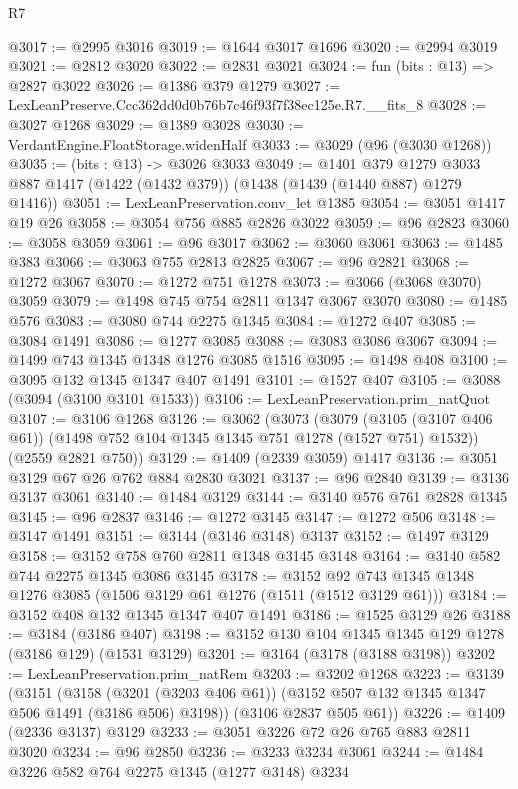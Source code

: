 \begin{lexlean}{R7}
\begin{coremodule}
@3017 := @2995 @3016
@3019 := @1644 @3017 @1696
@3020 := @2994 @3019
@3021 := @2812 @3020
@3022 := @2831 @3021
@3024 := fun (bits : @13) => @2827 @3022
@3026 := @1386 @379 @1279
@3027 := LexLeanPreserve.Ccc362dd0d0b76b7c46f93f7f38ec125e.R7.__fits_8
@3028 := @3027 @1268
@3029 := @1389 @3028
@3030 := VerdantEngine.FloatStorage.widenHalf
@3033 := @3029 (@96 (@3030 @1268))
@3035 := (bits : @13) -> @3026 @3033
@3049 := @1401
    @379
    @1279
    @3033
    @887
    @1417
    (@1422 (@1432 @379))
    (@1438 (@1439 (@1440 @887) @1279 @1416))
@3051 := LexLeanPreservation.conv_let @1385
@3054 := @3051 @1417 @19 @26
@3058 := @3054 @756 @885 @2826 @3022
@3059 := @96 @2823
@3060 := @3058 @3059
@3061 := @96 @3017
@3062 := @3060 @3061
@3063 := @1485 @383
@3066 := @3063 @755 @2813 @2825
@3067 := @96 @2821
@3068 := @1272 @3067
@3070 := @1272 @751 @1278
@3073 := @3066 (@3068 @3070) @3059
@3079 := @1498 @745 @754 @2811 @1347 @3067 @3070
@3080 := @1485 @576
@3083 := @3080 @744 @2275 @1345
@3084 := @1272 @407
@3085 := @3084 @1491
@3086 := @1277 @3085
@3088 := @3083 @3086 @3067
@3094 := @1499 @743 @1345 @1348 @1276 @3085 @1516
@3095 := @1498 @408
@3100 := @3095 @132 @1345 @1347 @407 @1491
@3101 := @1527 @407
@3105 := @3088 (@3094 (@3100 @3101 @1533))
@3106 := LexLeanPreservation.prim_natQuot
@3107 := @3106 @1268
@3126 := @3062
    (@3073
      (@3079 (@3105 (@3107 @406 @61)) (@1498 @752 @104 @1345 @1345 @751 @1278 (@1527 @751) @1532))
      (@2559 @2821 @750))
@3129 := @1409 (@2339 @3059) @1417
@3136 := @3051 @3129 @67 @26 @762 @884 @2830 @3021
@3137 := @96 @2840
@3139 := @3136 @3137 @3061
@3140 := @1484 @3129
@3144 := @3140 @576 @761 @2828 @1345
@3145 := @96 @2837
@3146 := @1272 @3145
@3147 := @1272 @506
@3148 := @3147 @1491
@3151 := @3144 (@3146 @3148) @3137
@3152 := @1497 @3129
@3158 := @3152 @758 @760 @2811 @1348 @3145 @3148
@3164 := @3140 @582 @744 @2275 @1345 @3086 @3145
@3178 := @3152 @92 @743 @1345 @1348 @1276 @3085 (@1506 @3129 @61 @1276 (@1511 (@1512 @3129 @61)))
@3184 := @3152 @408 @132 @1345 @1347 @407 @1491
@3186 := @1525 @3129 @26
@3188 := @3184 (@3186 @407)
@3198 := @3152 @130 @104 @1345 @1345 @129 @1278 (@3186 @129) (@1531 @3129)
@3201 := @3164 (@3178 (@3188 @3198))
@3202 := LexLeanPreservation.prim_natRem
@3203 := @3202 @1268
@3223 := @3139
    (@3151
      (@3158 (@3201 (@3203 @406 @61)) (@3152 @507 @132 @1345 @1347 @506 @1491 (@3186 @506) @3198))
      (@3106 @2837 @505 @61))
@3226 := @1409 (@2336 @3137) @3129
@3233 := @3051 @3226 @72 @26 @765 @883 @2811 @3020
@3234 := @96 @2850
@3236 := @3233 @3234 @3061
@3244 := @1484 @3226 @582 @764 @2275 @1345 (@1277 @3148) @3234

\end{coremodule}
\end{lexlean}
